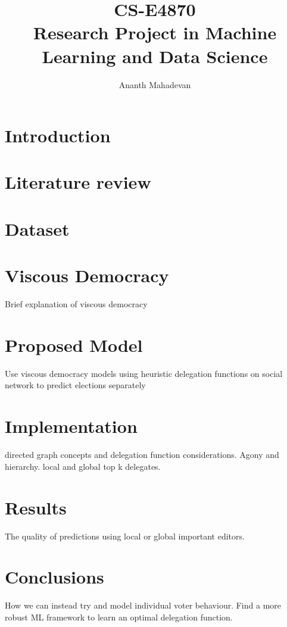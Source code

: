 \documentclass[twoside,leqno,twocolumn]{article}
\title{CS-E4870 \\
        \large Research Project in Machine Learning and Data Science}
\author{Ananth Mahadevan}
\affil{Department of Computer Science, Aalto University\\
\href{mailto:ananth.mahadevan@aalto.fi}{ananth.mahadevan@aalto.fi}}
\date{}
\begin{document}
\maketitle

\begin{abstract}
    \label{sec:abstract}
    
\end{abstract}

\section{Introduction}
\label{sec:introduction}


\section{Literature review}
\label{sec:literature-review}


\section{Dataset}
\label{sec:dataset}


\section{Viscous Democracy}
Brief explanation of viscous democracy
\label{sec:viscous}

\section{Proposed Model}
Use viscous democracy models using heuristic delegation functions on social network to predict elections separately
\label{sec:solution}

\section{Implementation}
directed graph concepts and delegation function considerations.
Agony and hierarchy. local and global top k delegates.
\label{sec:implementation}

\section{Results}
The quality of predictions using local or global important editors.
\label{sec:results}

\section{Conclusions}
How we can instead try and model individual voter behaviour. Find a more robust ML framework to learn an optimal delegation function.
\label{sec:conclusion}



\end{document}
